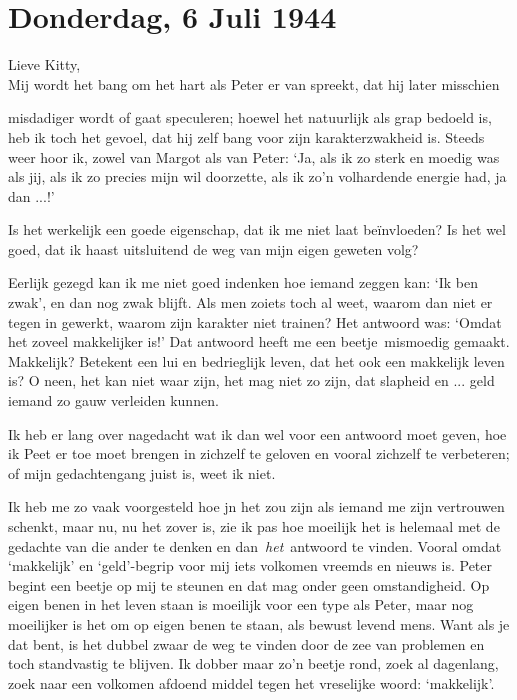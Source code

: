 \documentclass{book}
\begin{document}
\chapter{Donderdag, 6 Juli 1944}

Lieve Kitty,\\Mij wordt het bang om het hart als Peter er van spreekt,
dat hij later misschien

misdadiger wordt of gaat speculeren; hoewel het natuurlijk als grap
bedoeld is, heb ik toch het gevoel, dat hij zelf bang voor zijn
karakterzwakheid is. Steeds weer hoor ik, zowel van Margot als van
Peter: `Ja, als ik zo sterk en moedig was als jij, als ik zo precies
mijn wil doorzette, als ik zo'n volhardende energie had, ja dan ...!'

Is het werkelijk een goede eigenschap, dat ik me niet laat beïnvloeden?
Is het wel goed, dat ik haast uitsluitend de weg van mijn eigen geweten
volg?

Eerlijk gezegd kan ik me niet goed indenken hoe iemand zeggen kan: `Ik
ben zwak', en dan nog zwak blijft. Als men zoiets toch al weet, waarom
dan niet er tegen in gewerkt, waarom zijn karakter niet trainen? Het
antwoord was: `Omdat het zoveel makkelijker is!' Dat antwoord heeft me
een beetje~mismoedig gemaakt. Makkelijk? Betekent een lui en bedrieglijk
leven, dat het ook een makkelijk leven is? O neen, het kan niet waar
zijn, het mag niet zo zijn, dat slapheid en ... geld iemand zo gauw
verleiden kunnen.

Ik heb er lang over nagedacht wat ik dan wel voor een antwoord moet
geven, hoe ik Peet er toe moet brengen in zichzelf te geloven en vooral
zichzelf te verbeteren; of mijn gedachtengang juist is, weet ik niet.

Ik heb me zo vaak voorgesteld hoe jn het zou zijn als iemand me zijn
vertrouwen schenkt, maar nu, nu het zover is, zie ik pas hoe moeilijk
het is helemaal met de gedachte van die ander te denken en
dan~\emph{het}~antwoord te vinden. Vooral omdat `makkelijk' en
`geld'-begrip voor mij iets volkomen vreemds en nieuws is. Peter begint
een beetje op mij te steunen en dat mag onder geen omstandigheid. Op
eigen benen in het leven staan is moeilijk voor een type als Peter, maar
nog moeilijker is het om op eigen benen te staan, als bewust levend
mens. Want als je dat bent, is het dubbel zwaar de weg te vinden door de
zee van problemen en toch standvastig te blijven. Ik dobber maar zo'n
beetje rond, zoek al dagenlang, zoek naar een volkomen afdoend middel
tegen het vreselijke woord: `makkelijk'.
\end{document}
